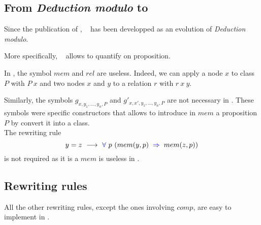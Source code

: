 \documentclass[a4paper]{article}
\begin{document}
\subsection{From \textit{Deduction modulo} to \lpcm}

Since the publication of \cite{zermodulo}, \lpcm~ has been developped as an evolution of \textit{Deduction modulo}.

More specifically, \lpcm~ allows to quantify on proposition.

In \dedukti, the symbol $mem$ and $rel$ are useless. Indeed, we can apply a node $x$ to class $P$ with $P~x$ and two nodes $x$ and $y$ to a relation $r$ with $r~x~y$.

Similarly, the symbols $g_{x,y_1,...,y_n,P}$ and $g'_{x,x',y_1,...,y_n,P}$ are not necessary in \dedukti. These symbols were specific constructors that allows to introduce in $mem$ a proposition $P$ by convert it into a class. \\

The rewriting rule $$y = z \ \lra \ \fa \ p \ (mem(y, p) \ \imp \ mem(z, p))$$ is not required as it is a $mem$ is useless in \lpcm.


\subsection{Rewriting rules}

All the other rewriting rules, except the ones involving $comp$, are easy to implement in \dedukti.
\end{document}
